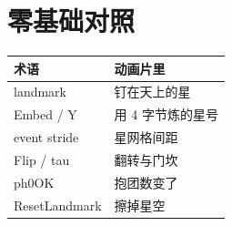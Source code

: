 \section{零基础对照}

\begin{center}
\begin{tabular}{@{}ll@{}}
\toprule
术语 & 动画片里 \\
\midrule
landmark & 钉在天上的星 \\
Embed / Y & 用 4 字节炼的星号 \\
event stride & 星网格间距 \\
Flip / tau & 翻转与门坎 \\
ph0OK & 抱团数变了 \\
ResetLandmark & 擦掉星空 \\
\bottomrule
\end{tabular}
\end{center}
